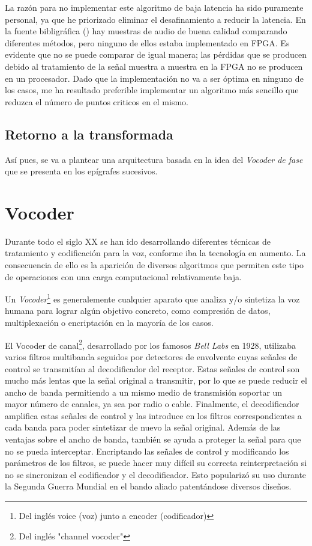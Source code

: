 La razón para no implementar este algoritmo de baja latencia ha sido puramente personal, ya que he priorizado eliminar el desafinamiento a reducir la latencia. En la fuente bibligráfica (\cite{hilbert}) hay muestras de audio de buena calidad comparando diferentes métodos, pero ninguno de ellos estaba implementado en FPGA. Es evidente que no se puede comparar de igual manera; las pérdidas que se producen debido al tratamiento de la señal muestra a muestra en la FPGA no se producen en un procesador. Dado que la implementación no va a ser óptima en ninguno de los casos, me ha resultado preferible implementar un algoritmo más sencillo que reduzca el número de puntos criticos en el mismo.

\subsection{Retorno a la transformada}
Así pues, se va a plantear una arquitectura basada en la idea del \emph{Vocoder de fase} que se presenta en los epígrafes sucesivos.
\section{Vocoder}
Durante todo el siglo XX se han ido desarrollando diferentes técnicas de tratamiento y codificación para la voz, conforme iba la tecnología en aumento. La consecuencia de ello es la aparición de diversos algoritmos que permiten este tipo de operaciones con una carga computacional relativamente baja. 

Un \emph{Vocoder}\footnote{Del inglés voice (voz) junto a encoder (codificador)} es generalemente cualquier aparato que analiza y/o sintetiza la voz humana para lograr  algún objetivo concreto, como compresión de datos, multiplexación o encriptación en la mayoría de los casos.

El Vocoder de canal\footnote{Del inglés "channel vocoder"}, desarrollado por los famosos \emph{Bell Labs} en 1928, utilizaba varios filtros multibanda seguidos por detectores de envolvente cuyas señales de control se transmitían al decodificador del receptor. Estas señales de control son mucho más lentas que la señal original a transmitir, por lo que se puede reducir el ancho de banda permitiendo a un mismo medio de transmisión soportar un mayor número de canales, ya sea por radio o cable. Finalmente, el decodificador amplifica estas señales de control y las introduce en los filtros correspondientes a cada banda para poder sintetizar de nuevo la señal original. Además de las ventajas sobre el ancho de banda, también se ayuda a proteger la señal para que no se pueda interceptar. Encriptando las señales de control y modificando los parámetros de los filtros, se puede hacer muy difícil su correcta reinterpretación si no se sincronizan el codificador y el decodificador. Esto popularizó su uso durante la Segunda Guerra Mundial en el bando aliado patentándose diversos diseños.

